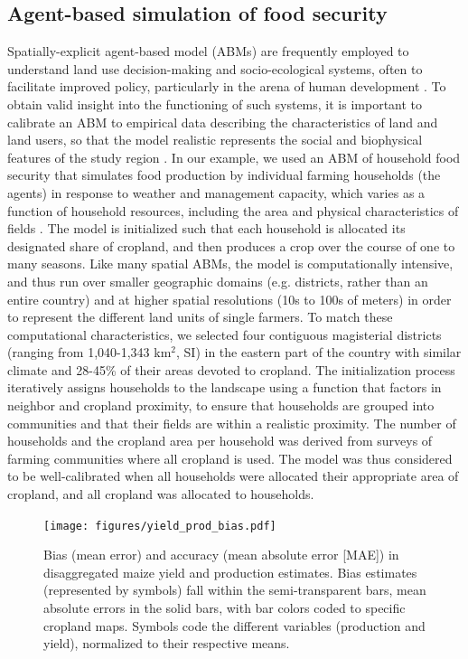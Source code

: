 \documentclass{pnastwo}
\begin{document}
\begin{article}
\subsection{Agent-based simulation of food security}
Spatially-explicit agent-based model (ABMs) are frequently employed to understand land use decision-making and socio-ecological systems, often to facilitate improved policy, particularly in the arena of human development \cite{berger_creating_2006}. To obtain valid insight into the functioning of such systems, it is important to calibrate an ABM to empirical data describing the characteristics of land and land users, so that the model realistic represents the social and biophysical features of the study region \cite{berger_creating_2006}. In our example, we used an ABM of household food security that simulates food production by individual farming households (the agents) in response to weather and management capacity, which varies as a function of household resources, including the area and physical characteristics of fields \cite{chen_dependency_2013}. The model is initialized such that each household is allocated its designated share of cropland, and then produces a crop over the course of one to many seasons. Like many spatial ABMs, the model is computationally intensive, and thus run over smaller geographic domains (e.g. districts, rather than an entire country) and at higher spatial resolutions (10s to 100s of meters) in order to represent the different land units of single farmers. To match these computational characteristics, we selected four contiguous magisterial districts (ranging from 1,040-1,343 km$^2$, SI) in the eastern part of the country with similar climate and 28-45\% of their areas devoted to cropland. The initialization process iteratively assigns households to the landscape using a function that factors in neighbor and cropland proximity, to ensure that households are grouped into communities and that their fields are within a realistic proximity. The number of households and the cropland area per household was derived from surveys of farming communities where all cropland is used. The model was thus considered to be well-calibrated when all households were allocated their appropriate area of cropland, and all cropland was allocated to households. 

\begin{figure}[!hb]
\centerline{\texttt{[image: figures/yield\_prod\_bias.pdf]}}
\caption{Bias (mean error) and accuracy (mean absolute error [MAE]) in disaggregated maize yield and production estimates. Bias estimates (represented by symbols) fall within the semi-transparent bars, mean absolute errors in the solid bars, with bar colors coded to specific cropland maps.  Symbols code the different variables (production and yield), normalized to their respective means.}
\label{afoto}
\end{figure}


\end{article}
\end{document}
